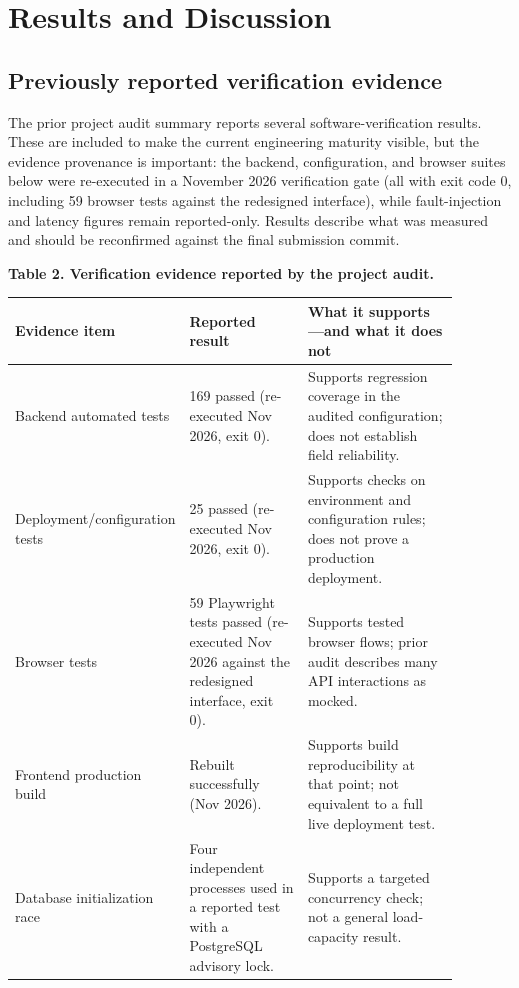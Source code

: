 \documentclass[11pt,a4paper]{article}
\begin{document}
\section{Results and Discussion}

\subsection{Previously reported verification evidence}

The prior project audit summary reports several software-verification results. These are included to make the current engineering maturity visible, but the evidence provenance is important: the backend, configuration, and browser suites below were re-executed in a November 2026 verification gate (all with exit code 0, including 59 browser tests against the redesigned interface), while fault-injection and latency figures remain reported-only. Results describe what was measured and should be reconfirmed against the final submission commit.

\textbf{Table 2. Verification evidence reported by the project audit.}

\begin{table}[H]\centering\small

\begin{tabular}{|p{0.23\linewidth}|p{0.29\linewidth}|p{0.36\linewidth}|}\hline

\textbf{Evidence item} & \textbf{Reported result} & \textbf{What it supports—and what it does not}\\\hline

Backend automated tests & 169 passed (re-executed Nov 2026, exit 0). & Supports regression coverage in the audited configuration; does not establish field reliability.\\\hline

Deployment/configuration tests & 25 passed (re-executed Nov 2026, exit 0). & Supports checks on environment and configuration rules; does not prove a production deployment.\\\hline

Browser tests & 59 Playwright tests passed (re-executed Nov 2026 against the redesigned interface, exit 0). & Supports tested browser flows; prior audit describes many API interactions as mocked.\\\hline

Frontend production build & Rebuilt successfully (Nov 2026). & Supports build reproducibility at that point; not equivalent to a full live deployment test.\\\hline

Database initialization race & Four independent processes used in a reported test with a PostgreSQL advisory lock. & Supports a targeted concurrency check; not a general load-capacity result.\\\hline

\end{tabular}\end{table}
\end{document}
